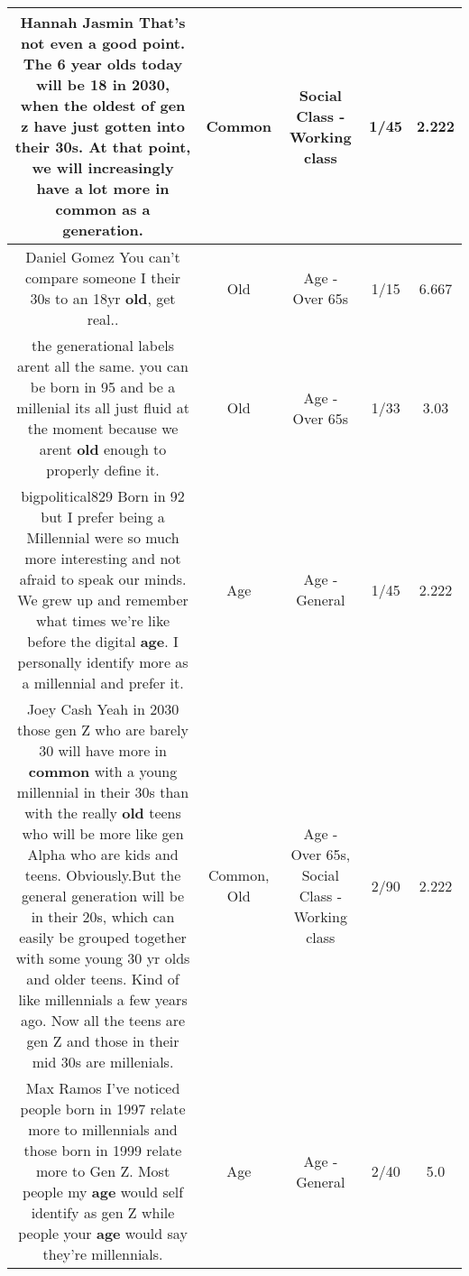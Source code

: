 \documentclass[11pt]{article}
\newlength\mylength
\begin{document}
\begin{center}
\begin{longtable}{|C{.65\mylength}|C{.30\mylength}|C{.12\mylength}|C{.12\mylength}|C{.12\mylength}|}
  \small Hannah Jasmin That's not even a good point. The 6 year olds today will be 18 in 2030, when the oldest of gen z have just gotten into their 30s. At that point, we will increasingly have a lot more in \textbf{common} as a generation.\normalsize   & Common & Social Class - Working class & 1/45 & 2.222 \\  \hline
  \small Daniel Gomez You can't compare someone I their 30s to an 18yr \textbf{old}, get real..\normalsize   & Old & Age - Over 65s & 1/15 & 6.667 \\  \hline
  \small the generational labels arent all the same. you can be born in 95 and be a millenial its all just fluid at the moment because we arent \textbf{old} enough to properly define it.\normalsize   & Old & Age - Over 65s & 1/33 & 3.03 \\  \hline
  \small bigpolitical829 Born in 92 but I prefer being a Millennial were so much more interesting and not afraid to speak our minds. We grew up and remember what times we're like before the digital \textbf{age}. I personally identify more as a millennial and prefer it.\normalsize   & Age & Age - General & 1/45 & 2.222 \\  \hline
  \small Joey Cash Yeah in 2030 those gen Z who are barely 30 will have more in \textbf{common} with a young millennial in their 30s than with the really \textbf{old} teens who will be more like gen Alpha who are kids and teens. Obviously.But the general generation will be in their 20s, which can easily be grouped together with some young 30 yr olds and older teens. Kind of like millennials a few years ago. Now all the teens are gen Z and those in their mid 30s are millenials.\normalsize   & Common, Old & Age - Over 65s, Social Class - Working class & 2/90 & 2.222 \\  \hline
  \small Max Ramos I've noticed people born in 1997 relate more to millennials and those born in 1999 relate more to Gen Z. Most people my \textbf{age} would self identify as gen Z while people your \textbf{age} would say they're millennials.\normalsize   & Age & Age - General & 2/40 & 5.0 \\  \hline

\end{longtable}
\end{center}
\end{document}
